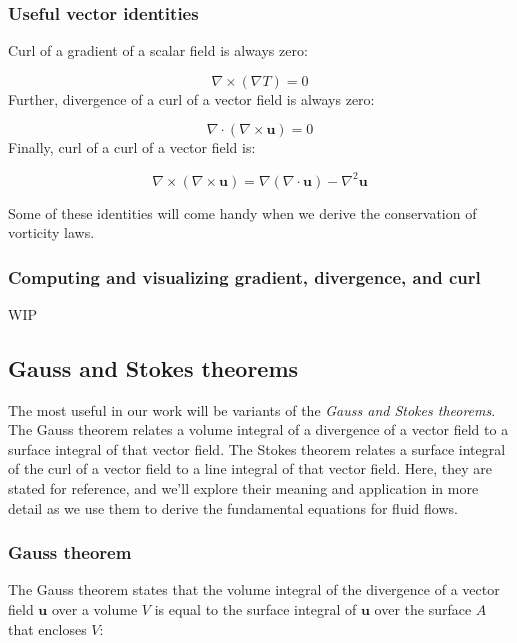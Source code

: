 \documentclass[12pt]{article}
\numberwithin{equation}{section}
\numberwithin{figure}{section}
\numberwithin{table}{section}
\begin{document}
\subsubsection{Useful vector identities}

Curl of a gradient of a scalar field is always zero:

\begin{equation}
  \nabla \times (\nabla T) = 0
\end{equation}
Further, divergence of a curl of a vector field is always zero:

\begin{equation}
  \nabla \cdot (\nabla \times \mathbf{u}) = 0
\end{equation}
Finally, curl of a curl of a vector field is:

\begin{equation}
  \nabla \times (\nabla \times \mathbf{u}) = \nabla (\nabla \cdot \mathbf{u}) - \nabla^2 \mathbf{u}
\end{equation}

Some of these identities will come handy when we derive the conservation of
vorticity laws.

\subsubsection{Computing and visualizing gradient, divergence, and curl}

WIP

\subsection{Gauss and Stokes theorems}

The most useful in our work will be variants of the
\textit{Gauss and Stokes theorems}.
The Gauss theorem relates a volume integral of a divergence of a vector field
to a surface integral of that vector field.
The Stokes theorem relates a surface integral of the curl of a vector field to
a line integral of that vector field.
Here, they are stated for reference, and we'll explore their meaning and
application in more detail as we use them to derive the fundamental equations
for fluid flows.

\subsubsection{Gauss theorem}

The Gauss theorem states that the volume integral of the
divergence of a vector field $\mathbf{u}$ over a volume $V$ is equal to the
surface integral of $\mathbf{u}$ over the surface $A$ that encloses $V$:
\end{document}
